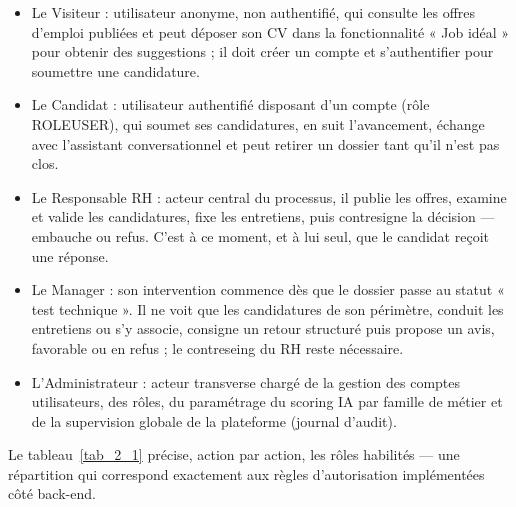 \documentclass[]{./tpl/isipfe}
\def\_{\textunderscore\allowbreak}
\begin{document}
\begin{itemize}
\item Le Visiteur : utilisateur anonyme, non authentifié, qui consulte les offres d’emploi publiées et peut déposer son CV dans la fonctionnalité « Job idéal » pour obtenir des suggestions ; il doit créer un compte et s’authentifier pour soumettre une candidature.
\item Le Candidat : utilisateur authentifié disposant d’un compte (rôle ROLE\_USER), qui soumet ses candidatures, en suit l’avancement, échange avec l’assistant conversationnel et peut retirer un dossier tant qu’il n’est pas clos.
\item Le Responsable RH : acteur central du processus, il publie les offres, examine et valide les candidatures, fixe les entretiens, puis contresigne la décision — embauche ou refus. C’est à ce moment, et à lui seul, que le candidat reçoit une réponse.
\item Le Manager : son intervention commence dès que le dossier passe au statut « test technique ». Il ne voit que les candidatures de son périmètre, conduit les entretiens ou s’y associe, consigne un retour structuré puis propose un avis, favorable ou en refus ; le contreseing du RH reste nécessaire.
\item L’Administrateur : acteur transverse chargé de la gestion des comptes utilisateurs, des rôles, du paramétrage du scoring IA par famille de métier et de la supervision globale de la plateforme (journal d’audit).
\end{itemize}

Le tableau~\ref{tab_2_1} précise, action par action, les rôles habilités — une répartition qui correspond exactement aux règles d’autorisation implémentées côté back-end.
\end{document}
